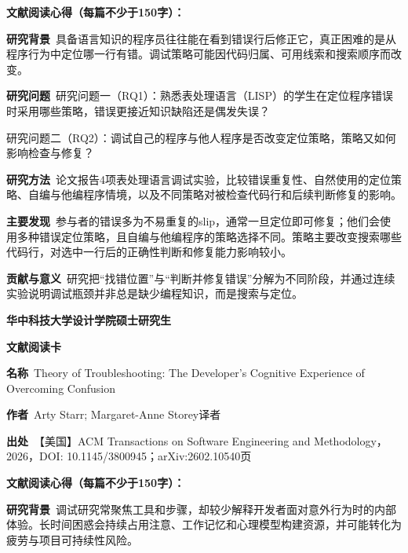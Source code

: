 \noindent\textbf{文献阅读心得（每篇不少于150字）：}\par
\noindent\textbf{研究背景}\ 具备语言知识的程序员往往能在看到错误行后修正它，真正困难的是从程序行为中定位哪一行有错。调试策略可能因代码归属、可用线索和搜索顺序而改变。\par
\noindent\textbf{研究问题}\ 研究问题一（RQ1）：熟悉表处理语言（LISP）的学生在定位程序错误时采用哪些策略，错误更接近知识缺陷还是偶发失误？\par
研究问题二（RQ2）：调试自己的程序与他人程序是否改变定位策略，策略又如何影响检查与修复？\par
\noindent\textbf{研究方法}\ 论文报告4项表处理语言调试实验，比较错误重复性、自然使用的定位策略、自编与他编程序情境，以及不同策略对被检查代码行和后续判断修复的影响。\par
\noindent\textbf{主要发现}\ 参与者的错误多为不易重复的slip，通常一旦定位即可修复；他们会使用多种错误定位策略，且自编与他编程序的策略选择不同。策略主要改变搜索哪些代码行，对选中一行后的正确性判断和修复能力影响较小。\par
\noindent\textbf{贡献与意义}\ 研究把“找错位置”与“判断并修复错误”分解为不同阶段，并通过连续实验说明调试瓶颈并非总是缺少编程知识，而是搜索与定位。\par
\clearpage
\begin{center}
{\songti\bfseries\fontsize{18.5pt}{27.75pt}\selectfont 华中科技大学设计学院硕士研究生\par}
{\songti\bfseries\fontsize{18.5pt}{27.75pt}\selectfont 文献阅读卡\par}
\end{center}
\vspace{0.25em}
\noindent\underline{}\par
\vspace{0.35em}
\noindent\textbf{名称}\ Theory of Troubleshooting: The Developer’s Cognitive Experience of Overcoming Confusion\par
\noindent\textbf{作者}\ Arty Starr; Margaret-Anne Storey\quad 译者\par
\noindent\textbf{出处}\ 【美国】ACM Transactions on Software Engineering and Methodology，2026，DOI: 10.1145/3800945；arXiv:2602.10540\quad 页\par
\vspace{0.35em}
\noindent\textbf{文献阅读心得（每篇不少于150字）：}\par
\noindent\textbf{研究背景}\ 调试研究常聚焦工具和步骤，却较少解释开发者面对意外行为时的内部体验。长时间困惑会持续占用注意、工作记忆和心理模型构建资源，并可能转化为疲劳与项目可持续性风险。\par
